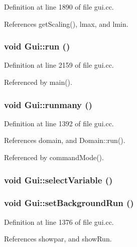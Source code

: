 Definition at line 1890 of file gui.cc.

References getScaling(), lmax, and lmin.\hypertarget{namespaceGui_225eb7edaace31eb6cc4ec3173b2a703}{
\subsubsection[{run}]{\setlength{\rightskip}{0pt plus 5cm}void Gui::run ()}}
\label{namespaceGui_225eb7edaace31eb6cc4ec3173b2a703}




Definition at line 2159 of file gui.cc.

Referenced by main().\hypertarget{namespaceGui_7799b76168d5342d97a7db05630b4c3a}{
\subsubsection[{runmany}]{\setlength{\rightskip}{0pt plus 5cm}void Gui::runmany ()}}
\label{namespaceGui_7799b76168d5342d97a7db05630b4c3a}




Definition at line 1392 of file gui.cc.

References domain, and Domain::run().

Referenced by commandMode().\hypertarget{namespaceGui_dd6f6cfa5773cf46c29030ef50a87a06}{
\subsubsection[{selectVariable}]{\setlength{\rightskip}{0pt plus 5cm}void Gui::selectVariable ()}}
\label{namespaceGui_dd6f6cfa5773cf46c29030ef50a87a06}


\hypertarget{namespaceGui_8ade665fa0c7e87786e08242f88eff40}{
\subsubsection[{setBackgroundRun}]{\setlength{\rightskip}{0pt plus 5cm}void Gui::setBackgroundRun ()}}
\label{namespaceGui_8ade665fa0c7e87786e08242f88eff40}




Definition at line 1376 of file gui.cc.

References showpar, and showRun.

